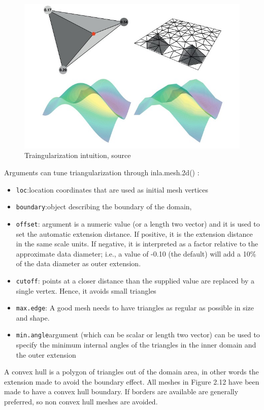 \documentclass[
  12pt,
  a4paper,
  oneside]{book}
\providecommand{\tightlist}{%
  \setlength{\itemsep}{0pt}\setlength{\parskip}{0pt}}
\theoremstyle{definition}
\theoremstyle{definition}
\theoremstyle{definition}
\theoremstyle{remark}
\begin{document}
\begin{figure}
\centering
\includegraphics{images/triangle.jpg}
\caption{Traingularization intuition, \citet{Krainski-Rubio} source}
\end{figure}

Arguments can tune triangularization through inla.mesh.2d() :

\begin{itemize}
\tightlist
\item
  \texttt{loc}:location coordinates that are used as initial mesh vertices
\item
  \texttt{boundary}:object describing the boundary of the domain,
\item
  \texttt{offset}: argument is a numeric value (or a length two vector) and it is used
  to set the automatic extension distance. If positive, it is the extension distance
  in the same scale units. If negative, it is interpreted as a factor relative to the
  approximate data diameter; i.e., a value of -0.10 (the default) will add a 10\%
  of the data diameter as outer extension.
\item
  \texttt{cutoff}: points at a closer distance than the supplied value are replaced by a single vertex. Hence, it avoids small triangles
\item
  \texttt{max.edge}: A good mesh needs to have triangles as regular as possible in size and shape.
\item
  \texttt{min.angle}argument (which can be scalar or length two vector) can be used to specify the minimum internal angles of the triangles in the inner domain and the outer extension
\end{itemize}

A convex hull is a polygon of triangles out of the domain area, in other words the extension made to avoid the boundary effect. All meshes in Figure 2.12 have been made to have a convex hull boundary. If borders are available are generally preferred, so non convex hull meshes are avoided.
\end{document}
